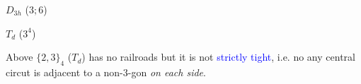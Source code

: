 \documentclass{beamer}
\begin{document}
\begin{frame}
\begin{center}
\begin{minipage}[b]{28mm}
$D_{3h}$ ($3;6$)
\end{minipage}
\begin{minipage}[b]{28mm}
\centering
{}\par
$T_{d}$ ($3^4$)   
\end{minipage}
\vspace{1.5mm} 

\begin{minipage}{35mm}
\centering
\par
\end{minipage}
\end{center}
Above $\{2,3\}_4$ ($T_{d}$) has no  railroads but it is not  
\textcolor{blue}{strictly tight}, i.e.  no any central circut is  
adjacent to a 
non-$3$-gon {\em on each side}.
\end{frame}
\end{document}
